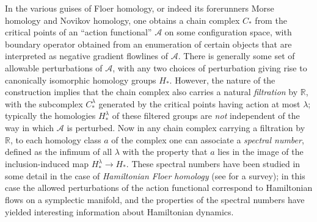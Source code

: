 \documentclass{amsart}
\theoremstyle{plain}
\theoremstyle{definition}
\theoremstyle{remark}
\begin{document}
In the various guises of Floer homology, or indeed its forerunners Morse homology and Novikov homology, one obtains a chain complex $C_*$ from the critical points of an ``action functional'' $\mathcal{A}$ on some configuration space, with boundary operator obtained from an enumeration of certain objects that are interpreted as negative gradient flowlines of $\mathcal{A}$.  There is generally some set of allowable perturbations of $\mathcal{A}$, with any two choices of perturbation giving rise to canonically isomorphic homology groups $H_*$. However, the nature of the construction implies that the chain complex also carries a natural \emph{filtration} by $\mathbb{R}$, with the subcomplex $C_{*}^{\lambda}$ generated by the critical points having action at most $\lambda$; typically the homologies $H_{*}^{\lambda}$ of these filtered groups are \emph{not} independent of the way in which $\mathcal{A}$ is perturbed.  Now in any chain complex carrying a filtration by $\mathbb{R}$, to each homology class $a$ of the complex one can associate a \emph{spectral number}, defined as the infimum of all $\lambda$ with the property that $a$ lies in the image of the inclusion-induced map $H_{*}^{\lambda}\to H_*$.  These spectral numbers have been studied in some detail in the case of \emph{Hamiltonian Floer homology} (see \cite{Oh} for a survey); in this case the allowed perturbations of the action functional correspond to Hamiltonian flows on a symplectic manifold, and the properties of the spectral numbers have yielded interesting information about Hamiltonian dynamics.  
\end{document}
